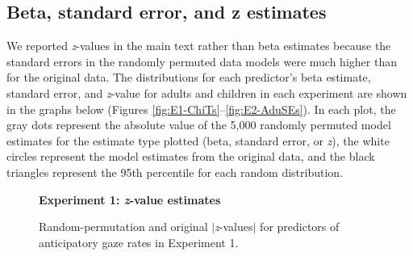 \documentclass[authoryear, 12pt]{elsarticle}
\begin{document}
\subsection{Beta, standard error, and z estimates}
We reported \textit{z}-values in the main text rather than beta estimates because the standard errors in the randomly permuted data models were much higher than for the original data. The distributions for each predictor's beta estimate, standard error, and \textit{z}-value for adults and children in each experiment are shown in the graphs below (Figures \ref{fig:E1-ChiTs}--\ref{fig:E2-AduSEs}). In each plot, the gray dots represent the absolute value of the 5,000 randomly permuted model estimates for the estimate type plotted (beta, standard error, or \textit{z}), the white circles represent the model estimates from the original data, and the black triangles represent the 95th percentile for each random distribution.

\begin{figure}
  \centering
  \textbf{Experiment 1: \textit{z}-value estimates}\par\medskip
  \hfill
  \caption{Random-permutation and original $|$\textit{z}-values$|$ for predictors of anticipatory gaze rates in Experiment 1.}
\label{fig:E1-Ts}
\end{figure}
\end{document}
